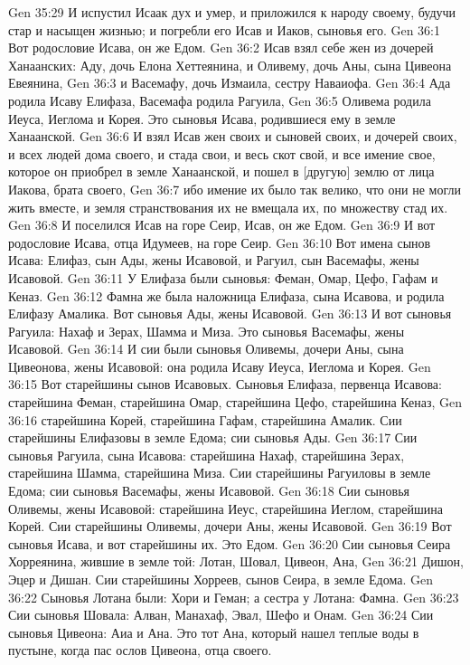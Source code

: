 Gen 35:29  И испустил Исаак дух и умер, и приложился к народу своему, будучи стар и насыщен жизнью; и погребли его Исав и Иаков, сыновья его.
Gen 36:1  Вот родословие Исава, он же Едом.
Gen 36:2  Исав взял себе жен из дочерей Ханаанских: Аду, дочь Елона Хеттеянина, и Оливему, дочь Аны, сына Цивеона Евеянина,
Gen 36:3  и Васемафу, дочь Измаила, сестру Наваиофа.
Gen 36:4  Ада родила Исаву Елифаза, Васемафа родила Рагуила,
Gen 36:5  Оливема родила Иеуса, Иеглома и Корея. Это сыновья Исава, родившиеся ему в земле Ханаанской.
Gen 36:6  И взял Исав жен своих и сыновей своих, и дочерей своих, и всех людей дома своего, и стада свои, и весь скот свой, и все имение свое, которое он приобрел в земле Ханаанской, и пошел в [другую] землю от лица Иакова, брата своего,
Gen 36:7  ибо имение их было так велико, что они не могли жить вместе, и земля странствования их не вмещала их, по множеству стад их.
Gen 36:8  И поселился Исав на горе Сеир, Исав, он же Едом.
Gen 36:9  И вот родословие Исава, отца Идумеев, на горе Сеир.
Gen 36:10  Вот имена сынов Исава: Елифаз, сын Ады, жены Исавовой, и Рагуил, сын Васемафы, жены Исавовой.
Gen 36:11  У Елифаза были сыновья: Феман, Омар, Цефо, Гафам и Кеназ.
Gen 36:12  Фамна же была наложница Елифаза, сына Исавова, и родила Елифазу Амалика. Вот сыновья Ады, жены Исавовой.
Gen 36:13  И вот сыновья Рагуила: Нахаф и Зерах, Шамма и Миза. Это сыновья Васемафы, жены Исавовой.
Gen 36:14  И сии были сыновья Оливемы, дочери Аны, сына Цивеонова, жены Исавовой: она родила Исаву Иеуса, Иеглома и Корея.
Gen 36:15  Вот старейшины сынов Исавовых. Сыновья Елифаза, первенца Исавова: старейшина Феман, старейшина Омар, старейшина Цефо, старейшина Кеназ,
Gen 36:16  старейшина Корей, старейшина Гафам, старейшина Амалик. Сии старейшины Елифазовы в земле Едома; сии сыновья Ады.
Gen 36:17  Сии сыновья Рагуила, сына Исавова: старейшина Нахаф, старейшина Зерах, старейшина Шамма, старейшина Миза. Сии старейшины Рагуиловы в земле Едома; сии сыновья Васемафы, жены Исавовой.
Gen 36:18  Сии сыновья Оливемы, жены Исавовой: старейшина Иеус, старейшина Иеглом, старейшина Корей. Сии старейшины Оливемы, дочери Аны, жены Исавовой.
Gen 36:19  Вот сыновья Исава, и вот старейшины их. Это Едом.
Gen 36:20  Сии сыновья Сеира Хорреянина, жившие в земле той: Лотан, Шовал, Цивеон, Ана,
Gen 36:21  Дишон, Эцер и Дишан. Сии старейшины Хорреев, сынов Сеира, в земле Едома.
Gen 36:22  Сыновья Лотана были: Хори и Геман; а сестра у Лотана: Фамна.
Gen 36:23  Сии сыновья Шовала: Алван, Манахаф, Эвал, Шефо и Онам.
Gen 36:24  Сии сыновья Цивеона: Аиа и Ана. Это тот Ана, который нашел теплые воды в пустыне, когда пас ослов Цивеона, отца своего.
